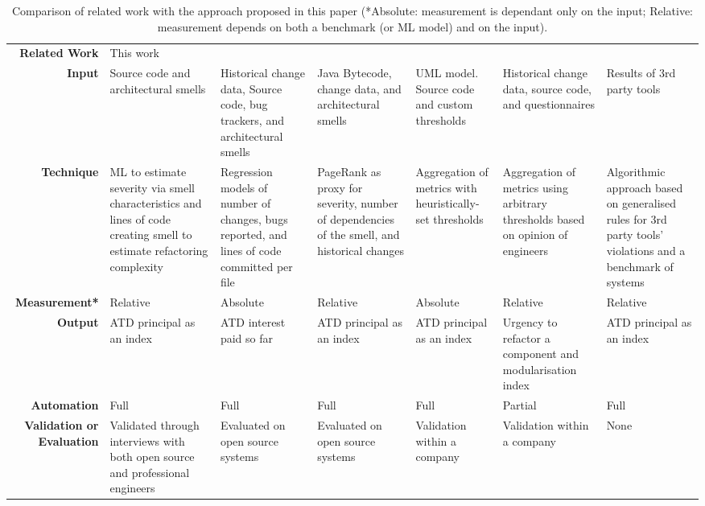 \begin{sidewaystable}[]
    \scriptsize
    \centering
    \caption{Comparison of related work with the approach proposed in this paper (*Absolute: measurement is dependant only on the input; Relative: measurement depends on both a benchmark (or ML model) and on the input).}
    \label{c6:tab:rw-comparison}
    \begin{tabular}{r|m{2.5cm}m{2.5cm}m{2.5cm}m{2.5cm}m{2.5cm}m{2.5cm}}
    \hline
    \textbf{Related Work} & This work & \cite{Xiao2016} & \cite{Roveda2018} & \cite{Martini2018b} & \cite{Wu2018} & \cite{Verdecchia2020} \\
    \textbf{Input} & Source code and architectural smells & Historical change data, Source code, bug trackers, and architectural smells & Java Bytecode, change data, and architectural smells & UML model. Source code and custom thresholds & Historical change data, source code, and questionnaires & Results of 3rd party tools \\
    \textbf{Technique} & ML to estimate severity via smell characteristics and lines of code creating smell to estimate refactoring complexity & Regression models of number of changes, bugs reported, and lines of code committed per file & PageRank as proxy for severity, number of dependencies of the smell, and historical changes & Aggregation of metrics with heuristically-set thresholds & Aggregation of metrics using arbitrary thresholds based on opinion of engineers & Algorithmic approach based on generalised rules for 3rd party tools' violations and a benchmark of systems \\
    \textbf{Measurement*} & Relative & Absolute & Relative & Absolute & Relative & Relative \\
    \textbf{Output} & ATD principal as an index & ATD interest paid so far & ATD principal as an index & ATD principal as an index & Urgency to refactor a component and modularisation index & ATD principal as an index \\
    \textbf{Automation} & Full & Full & Full & Full & Partial & Full \\
    \textbf{Validation or Evaluation} & Validated through interviews with both open source and professional engineers & Evaluated on open source systems & Evaluated on open source systems & Validation within a company & Validation within a company & None \\ \hline
    \end{tabular}
\end{sidewaystable}

